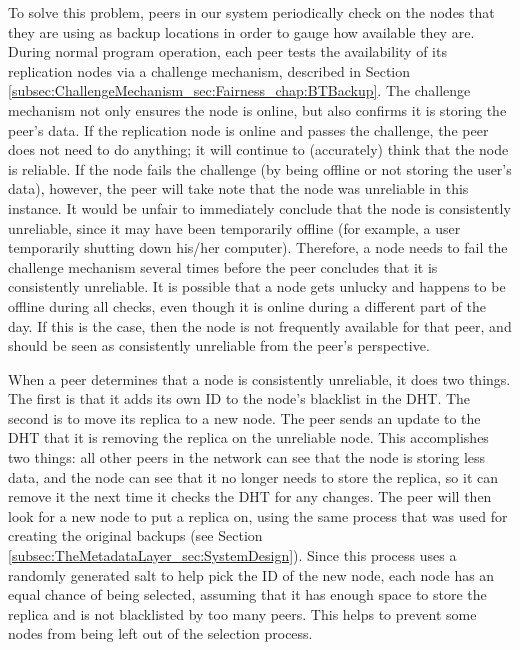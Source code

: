 \documentclass[12pt]{report}
\begin{document}
To solve this problem, peers in our system periodically check on the nodes that they are using as backup locations in order to gauge how available they are. During normal program operation, each peer tests the availability of its replication nodes via a challenge mechanism, described in Section \ref{subsec:ChallengeMechanism_sec:Fairness_chap:BTBackup}. The challenge mechanism not only ensures the node is online, but also confirms it is storing the peer's data. If the replication node is online and passes the challenge, the peer does not need to do anything; it will continue to (accurately) think that the node is reliable. If the node fails the challenge (by being offline or not storing the user's data), however, the peer will take note that the node was unreliable in this instance. It would be unfair to immediately conclude that the node is consistently unreliable, since it may have been temporarily offline (for example, a user temporarily shutting down his/her computer). Therefore, a node needs to fail the challenge mechanism several times before the peer concludes that it is consistently unreliable. It is possible that a node gets unlucky and happens to be offline during all checks, even though it is online during a different part of the day. If this is the case, then the node is not frequently available for that peer, and should be seen as consistently unreliable from the peer's perspective.

When a peer determines that a node is consistently unreliable, it does two things. The first is that it adds its own ID to the node's blacklist in the DHT. The second is to move its replica to a new node. The peer sends an update to the DHT that it is removing the replica on the unreliable node. This accomplishes two things: all other peers in the network can see that the node is storing less data, and the node can see that it no longer needs to store the replica, so it can remove it the next time it checks the DHT for any changes. The peer will then look for a new node to put a replica on, using the same process that was used for creating the original backups (see Section \ref{subsec:TheMetadataLayer_sec:SystemDesign}). Since this process uses a randomly generated salt to help pick the ID of the new node, each node has an equal chance of being selected, assuming that it has enough space to store the replica and is not blacklisted by too many peers. This helps to prevent some nodes from being left out of the selection process. %
\end{document}
